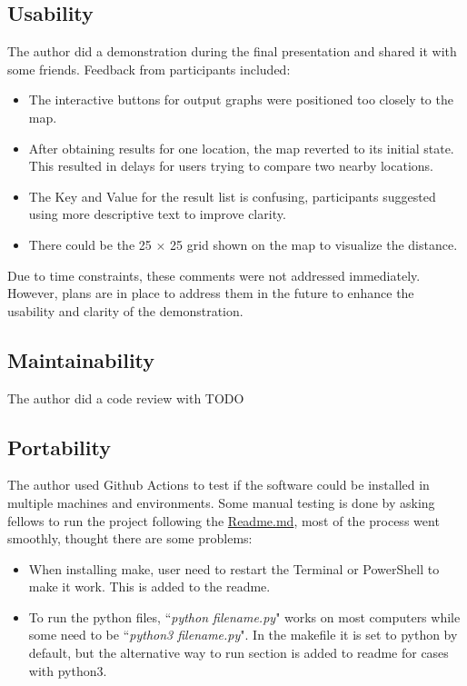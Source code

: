 \documentclass[12pt, titlepage]{article}
\begin{document}
\subsection{Usability}
The author did a demonstration during the final presentation and shared it with some friends. Feedback from participants included:
\begin{itemize}
\item The interactive buttons for output graphs were positioned too closely to the map.
\item After obtaining results for one location, the map reverted to its initial state. This resulted in delays for users trying to compare two nearby locations.
\item The Key and Value for the result list is confusing, participants suggested using more descriptive text to improve clarity.
\item There could be the 25 $\times$ 25 grid shown on the map to visualize the distance.
\end{itemize}
Due to time constraints, these comments were not addressed immediately. However, plans are in place to address them in the future to enhance the usability and clarity of the demonstration.

\subsection{Maintainability}
The author did a code review with TODO

\subsection{Portability}
The author used Github Actions to test if the software could be installed in multiple machines and environments. Some manual testing is done by asking fellows to run the project following the \href{https://github.com/CynthiaLiu0805/BridgeCorrosion/blob/main/README.md}{Readme.md}, most of the process went smoothly, thought there are some problems:
\begin{itemize}
\item When installing make, user need to restart the Terminal or PowerShell to make it work. This is added to the readme.
\item To run the python files, ``\textit{python filename.py}" works on most computers while some need to be ``\textit{python3 filename.py}". In the makefile it is set to python by default, but the alternative way to run section is added to readme for cases with python3.
\end{itemize}
\end{document}
